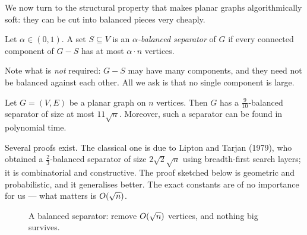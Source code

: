 We now turn to the structural property that makes planar graphs
algorithmically soft: they can be cut into balanced pieces very cheaply.

\begin{definition}
Let $\alpha \in (0,1)$. A set $S \subseteq V$ is an
\emph{$\alpha$-balanced separator} of $G$ if every connected component of
$G - S$ has at most $\alpha \cdot n$ vertices.
\end{definition}

Note what is \emph{not} required: $G - S$ may have many components, and they
need not be balanced against each other. All we ask is that no single component
is large.

\begin{theorem}\label{thm:planar-pst}
Let $G = (V,E)$ be a planar graph on $n$ vertices. Then $G$ has a
$\tfrac{9}{10}$-balanced separator of size at most $11\sqrt{n}$.
Moreover, such a separator can be found in polynomial time.
\end{theorem}

Several proofs exist. The classical one is due to Lipton and Tarjan (1979),
who obtained a $\tfrac{2}{3}$-balanced separator of size $2\sqrt{2}\sqrt{n}$
using breadth-first search layers; it is combinatorial and constructive. The
proof sketched below is geometric and probabilistic, and it generalises better.
The exact constants are of no importance for us --- what matters is
$O\!\left(\sqrt n\right)$.

\begin{figure}[ht]
\centering
{}
\caption{A balanced separator: remove $O\!\left(\sqrt n\right)$ vertices, and nothing
big survives.}
\label{fig:planar-separator}
\end{figure}

